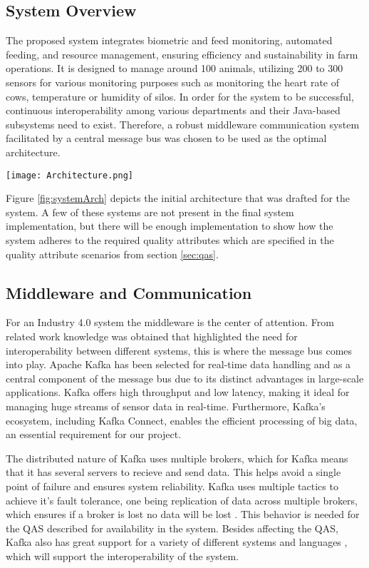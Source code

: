 \documentclass[conference]{IEEEtran}
\begin{document}
\subsection{System Overview}
The proposed system integrates biometric and feed monitoring, automated feeding, and resource management, ensuring efficiency and sustainability in farm operations. It is designed to manage around 100 animals, utilizing 200 to 300 sensors for various monitoring purposes such as monitoring the heart rate of cows, temperature or humidity of silos. In order for the system to be successful, continuous interoperability among various departments and their Java-based subsystems need to exist. Therefore, a robust middleware communication system facilitated by a central message bus was chosen to be used as the optimal architecture. \newline
\begin{figure*}[!ht]
    \centering
    \texttt{[image: Architecture.png]}
    \caption{The proposed architecture}
    \label{fig:systemArch}
\end{figure*}

Figure \ref{fig:systemArch} depicts the initial architecture that was drafted for the system. A few of these systems are not present in the final system implementation, but there will be enough implementation to show how the system adheres to the required quality attributes which are specified in the quality attribute scenarios from section \ref{sec:qas}.
\subsection{Middleware and Communication}
For an Industry 4.0 system the middleware is the center of attention. From related work knowledge was obtained that highlighted the need for interoperability between different systems, this is where the message bus comes into play.
Apache Kafka \cite{Apache2022Connect} has been selected for real-time data handling and as a central component of the message bus due to its distinct advantages in large-scale applications. Kafka offers high throughput and low latency, making it ideal for managing huge streams of sensor data in real-time. Furthermore, Kafka's ecosystem, including Kafka Connect, enables the efficient processing of big data, an essential requirement for our project.

The distributed nature of Kafka uses multiple brokers, which for Kafka means that it has several servers to recieve and send data. This helps avoid a single point of failure and ensures system reliability. Kafka uses multiple tactics to achieve it's fault tolerance, one being replication of data across multiple brokers, which ensures if a broker is lost no data will be lost \cite{AltexSoft_2022}. This behavior is needed for the QAS described for availability in the system.
Besides affecting the QAS, Kafka also has great support for a variety of different systems and languages \cite{AltexSoft_2022}, which will support the interoperability of the system.
\end{document}
